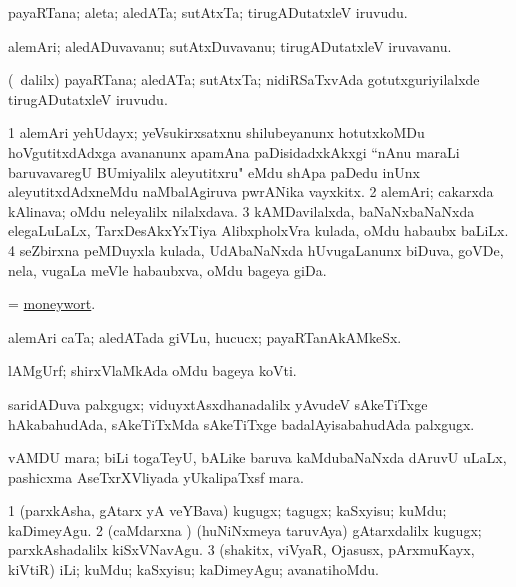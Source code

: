 \bentry
{} 
\gl{\nA}
\expl{}
\bmng
payaRTana; aleta; aledATa; sutAtxTa; tirugADutatxleV iruvudu. 
\emng
\eentry

\bentry
{} 
\gl{\nA}
\expl{}
\bmng
alemAri; aledADuvavanu; sutAtxDuvavanu; tirugADutatxleV iruvavanu. 
\emng
\eentry

\bentry
{} 
\gl{\nA}
\expl{}
\bmng
(\kanmu\ \bava dalilx) payaRTana; aledATa; sutAtxTa; nidiRSaTxvAda gotutxguriyilalxde tirugADutatxleV iruvudu. 
\emng
\eentry

\bentry
{}
\gl{\nA}
\expl{}
\bmng
\bnum
\num{1} alemAri yehUdayx; yeVsukirxsatxnu shilubeyanunx hotutxkoMDu hoVgutitxdAdxga avananunx apamAna paDisidadxkAkxgi ``nAnu maraLi baruvavaregU BUmiyalilx aleyutitxru" eMdu shApa paDedu inUnx aleyutitxdAdxneMdu naMbalAgiruva pwrANika vayxkitx. 
\num{2} alemAri; cakarxda kAlinava; oMdu neleyalilx nilalxdava. 
\num{3} kAMDavilalxda, baNaNxbaNaNxda elegaLuLaLx, TarxDesAkxYxTiya AlibxpholxVra kulada, oMdu habaubx baLiLx. 
\num{4} seZbirxna peMDuyxla kulada, UdAbaNaNxda hUvugaLanunx biDuva, goVDe, nela, \mo vugaLa meVle habaubxva, oMdu bageya giDa. 
\enum
\emng
\eentry

\bentry
{} 
\gl{\nA}
\expl{}
\bmng
= \hyperref{kandict_m.pdf}{M}{moneywort}{moneywort}. 
\emng
\eentry

\bentry
{} 
\gl{\nA}
\expl{}
\bmng
alemAri caTa; aledATada giVLu, hucucx; payaRTanAkAMkeSx. 
\emng
\eentry

\bentry
{} 
\gl{\nA}
\expl{}
\bmng
lAMgUrf; shirxVlaMkAda oMdu bageya koVti. 
\emng
\eentry

\bentry
{} 
\gl{\nA}
\expl{}
\bmng
saridADuva palxgugx; viduyxtAsxdhanadalilx yAvudeV sAkeTiTxge hAkabahudAda, sAkeTiTxMda sAkeTiTxge badalAyisabahudAda palxgugx. 
\emng
\eentry

\bentry
{} 
\gl{\nA}
\expl{}
\bmng
vAMDU mara; biLi togaTeyU, bALike baruva kaMdubaNaNxda dAruvU uLaLx, pashicxma AseTxrXVliyada yUkalipaTxsf mara. 
\emng
\eentry

\bentry
{} 
\gl{\akirx}
\expl{}
\bmng
\bnum
\num{1} (parxkAsha, gAtarx yA veYBava) kugugx; tagugx; kaSxyisu; kuMdu; kaDimeyAgu. 
\num{2} (caMdarxna \vi) (huNiNxmeya taruvAya) gAtarxdalilx kugugx; parxkAshadalilx kiSxVNavAgu. 
\num{3} (shakitx, viVyaR, Ojasusx, pArxmuKayx, kiVtiR) iLi; kuMdu; kaSxyisu; kaDimeyAgu; avanatihoMdu. 
\enum
\emng
\eentry

